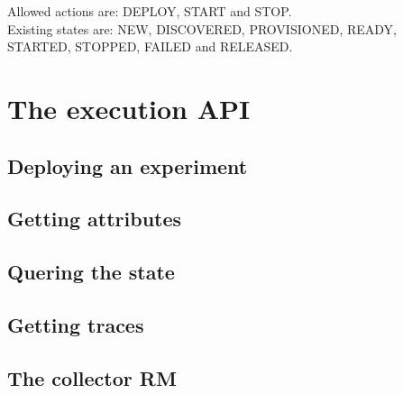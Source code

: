 Allowed actions are: DEPLOY, START and STOP. \\

Existing states are: NEW, DISCOVERED, PROVISIONED, READY, STARTED, STOPPED, 
FAILED and RELEASED. \\

\section{The execution API}

\subsection{Deploying an experiment}


\subsection{Getting attributes}

\subsection{Quering the state}

\subsection{Getting traces}
    


\subsection{The collector RM}




